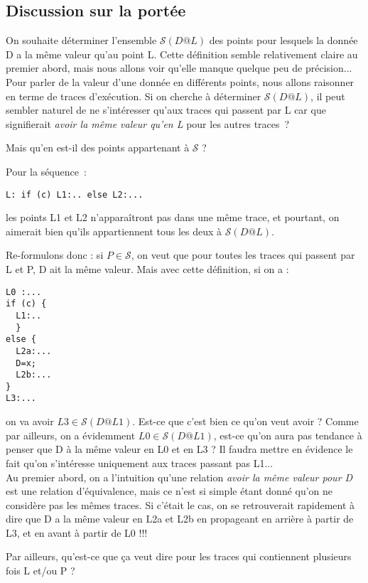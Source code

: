 \documentclass[a4paper,twoside]{article}
\renewcommand{\sc}{\mathcal{S}}
\begin{document}
\subsection{Discussion sur la portée}

On souhaite déterminer l'ensemble $\sc(D@L)$ des points
pour lesquels la donnée D a la même valeur qu'au point L.
Cette définition semble relativement claire au premier abord,
mais nous allons voir qu'elle manque quelque peu de précision...\\

Pour parler de la valeur d'une donnée en différents points,
nous allons raisonner en terme de traces d'exécution.
Si on cherche à déterminer $\sc(D@L)$,
il peut sembler naturel de ne s'intéresser qu'aux traces qui passent par L
car que signifierait {\it avoir la même valeur qu'en L} pour les autres traces~?

Mais qu'en est-il des points appartenant à $\sc$ ?

Pour la séquence~:

\centerline{\verb!L: if (c) L1:.. else L2:...!}

les points L1 et L2 n'apparaîtront pas dans une même trace, et pourtant,
on aimerait bien qu'ils appartiennent tous les deux à $\sc(D@L)$.

Re-formulons donc : si $P \in \sc$, on veut que pour toutes les traces qui passent
par L et P, D ait la même valeur.
Mais avec cette définition, si on a :

\begin{verbatim}
L0 :...
if (c) {
  L1:..
  }
else {
  L2a:...
  D=x;
  L2b:...
}
L3:...
\end{verbatim}

on va avoir $L3 \in \sc(D@L1)$. Est-ce que c'est bien ce qu'on veut avoir ?
Comme par ailleurs, on a évidemment $L0 \in \sc(D@L1)$, est-ce qu'on aura pas
tendance à penser que D à la même valeur en L0 et en L3 ?
Il faudra mettre en évidence le fait qu'on s'intéresse uniquement
aux traces passant pas L1...\\

Au premier abord, on a l'intuition qu'une relation
{\it avoir la même valeur pour D} est une relation d'équivalence, mais ce n'est
si simple étant donné qu'on
ne considère pas les mêmes traces. Si c'était le cas, on se retrouverait
rapidement à dire que D a la même valeur en L2a et L2b en propageant en
arrière à partir de L3, et en avant à partir de L0 !!!

Par ailleurs, qu'est-ce que ça veut dire pour les traces
qui contiennent plusieurs fois L et/ou P ?
\end{document}
